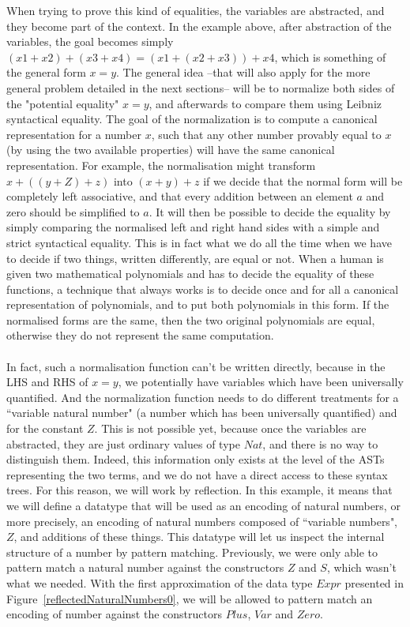 When trying to prove this kind of equalities, the variables are abstracted, and they become part of the context. In the example above, after abstraction of the variables, the goal becomes simply $(x1 + x2) + (x3 + x4) = (x1 + (x2 + x3)) + x4$, which is something of the general form $x=y$.
The general idea --that will also apply for the more general problem detailed in the next sections-- will be to normalize both sides of the "potential equality" $x=y$, and afterwards to compare them using Leibniz syntactical equality.
The goal of the normalization is to compute a canonical representation for a number $x$, such that any other number provably equal to $x$ (by using the two available properties) will have the same canonical representation. For example, the normalisation might transform $x+((y+Z)+z)$ into $(x+y)+z$ if we decide that the normal form will be completely left associative, and that every addition between an element $a$ and zero should be simplified to $a$. It will then be possible to decide the equality by simply comparing the normalised left and right hand sides with a simple and strict syntactical equality. This is in fact what we do all the time when we have to decide if two things, written differently, are equal or not. When a human is given two mathematical polynomials and has to decide the equality of these functions, a technique that always works is to decide once and for all a canonical representation of polynomials, and to put both polynomials in this form. If the normalised forms are the same, then the two original polynomials are equal, otherwise they do not represent the same computation.\\
\\
In fact, such a normalisation function can't be written directly, because in the LHS and RHS of $x=y$, we potentially have variables which have been universally quantified. And the normalization function needs to do different treatments for a ``variable natural number" (a number which has been universally quantified) and for the constant $Z$. This is not possible yet, because once the variables are abstracted, they are just ordinary values of type $Nat$, and there is no way to distinguish them. Indeed, this information only exists at the level of the ASTs representing the two terms, and we do not have a direct access to these syntax trees.
For this reason, we will work by reflection. In this example, it means that we will define a datatype that will be used as an encoding of natural numbers, or more precisely, an encoding of natural numbers composed of ``variable numbers", $Z$, and additions of these things. This datatype will let us inspect the internal structure of a number by pattern matching.
Previously, we were only able to pattern match a natural number against the constructors $Z$ and $S$, which wasn't what we needed.  With the first approximation of the data type $Expr$ presented in Figure~\ref{reflectedNaturalNumbers0}, we will be allowed to pattern match an encoding of number against the constructors $Plus$, $Var$ and $Zero$.


